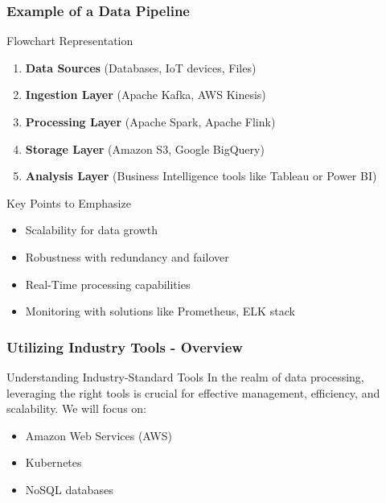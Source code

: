 \documentclass[aspectratio=169]{beamer}
\begin{document}
\begin{frame}[fragile]
    \frametitle{Example of a Data Pipeline}
    \begin{block}{Flowchart Representation}
        \begin{enumerate}
            \item \textbf{Data Sources} (Databases, IoT devices, Files)
            \item \textbf{Ingestion Layer} (Apache Kafka, AWS Kinesis)
            \item \textbf{Processing Layer} (Apache Spark, Apache Flink)
            \item \textbf{Storage Layer} (Amazon S3, Google BigQuery)
            \item \textbf{Analysis Layer} (Business Intelligence tools like Tableau or Power BI)
        \end{enumerate}
    \end{block}
    \begin{block}{Key Points to Emphasize}
        \begin{itemize}
            \item Scalability for data growth
            \item Robustness with redundancy and failover
            \item Real-Time processing capabilities
            \item Monitoring with solutions like Prometheus, ELK stack
        \end{itemize}
    \end{block}
\end{frame}

\begin{frame}[fragile]
    \frametitle{Utilizing Industry Tools - Overview}
    \begin{block}{Understanding Industry-Standard Tools}
        In the realm of data processing, leveraging the right tools is crucial for effective management, efficiency, and scalability. We will focus on:
        \begin{itemize}
            \item Amazon Web Services (AWS)
            \item Kubernetes
            \item NoSQL databases
        \end{itemize}
    \end{block}
\end{frame}
\end{document}

